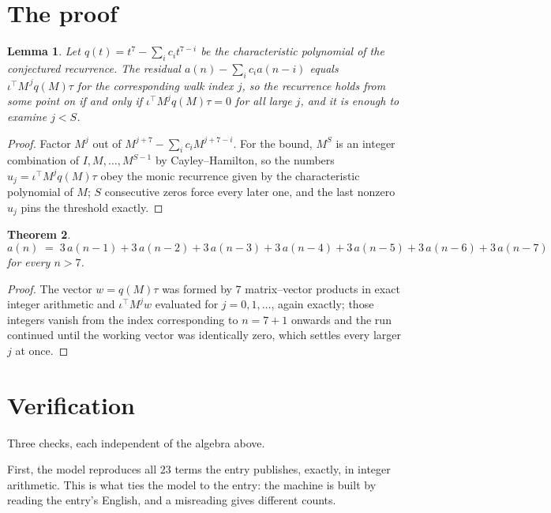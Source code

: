 \documentclass[11pt,a4paper]{article}
\theoremstyle{plain}
\newtheorem{theorem}{Theorem}
\newtheorem{lemma}[theorem]{Lemma}
\theoremstyle{definition}
\begin{document}
\section{The proof}

\begin{lemma}\label{lem:crit}
Let $q(t)=t^{7}-\sum_i c_it^{7-i}$ be the characteristic polynomial of the
conjectured recurrence. The residual $a(n)-\sum_ic_ia(n-i)$ equals
$\iota^{\!\top}M^{\,j}q(M)\tau$ for the corresponding walk index $j$, so the recurrence
holds from some point on if and only if $\iota^{\!\top}M^{j}q(M)\tau=0$ for all large $j$,
and it is enough to examine $j<S$.
\end{lemma}

\begin{proof}
Factor $M^{j}$ out of $M^{j+7}-\sum_ic_iM^{j+7-i}$. For the bound, $M^{S}$
is an integer combination of $I,M,\dots,M^{S-1}$ by Cayley--Hamilton, so the numbers
$u_j=\iota^{\!\top}M^{j}q(M)\tau$ obey the monic recurrence given by the characteristic
polynomial of $M$; $S$ consecutive zeros force every later one, and the last nonzero $u_j$
pins the threshold exactly.
\end{proof}

\begin{theorem}
\[
a(n)\;=\;3\,a(n-1) + 3\,a(n-2) + 3\,a(n-3) + 3\,a(n-4) + 3\,a(n-5) + 3\,a(n-6) + 3\,a(n-7)
\]
for every $n>7$.
\end{theorem}

\begin{proof}
The vector $w=q(M)\tau$ was formed by $7$ matrix--vector products in exact integer
arithmetic and $\iota^{\!\top}M^{j}w$ evaluated for $j=0,1,\dots$, again exactly; those
integers vanish from the index corresponding to $n=7+1$ onwards and the run continued
until the working vector was identically zero, which settles every larger $j$ at once.
\end{proof}

\section{Verification}

Three checks, each independent of the algebra above.

First, the model reproduces all $23$ terms the entry publishes, exactly, in integer
arithmetic. This is what ties the model to the entry: the machine is built by reading the
entry's English, and a misreading gives different counts.
\end{document}
